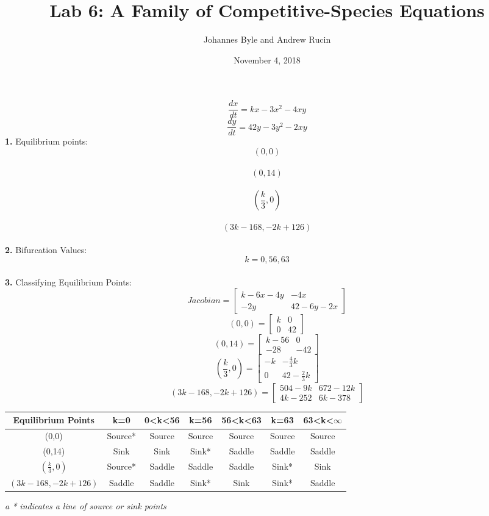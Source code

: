 \documentclass[english]{article}
\begin{document}
\title{Lab 6: A Family of Competitive-Species Equations}
\author{Johannes Byle and Andrew Rucin}
\date{November 4, 2018}
\maketitle
\begin{flushleft}
$$\frac{dx}{dt}=kx-3x^2-4xy$$
$$\frac{dy}{dt}=42y-3y^2-2xy$$
\textbf{1.} Equilibrium points:\\
$$(0,0)$$\\
$$(0,14)$$\\
$$(\frac{k}{3},0)$$\\
$$(3k-168,-2k+126)$$\\
\textbf{2.} Bifurcation Values:\\
$$k=0,56,63$$\\
\textbf{3.} Classifying Equilibrium Points:\\
$$
Jacobian=
\begin{bmatrix}
k-6x-4y & -4x \\
-2y & 42-6y-2x
\end{bmatrix}
$$
$$
(0,0)=
\begin{bmatrix}
k & 0 \\
0 & 42
\end{bmatrix}
$$
$$
(0,14)=
\begin{bmatrix}
k-56 & 0 \\
-28 & -42
\end{bmatrix}
$$
$$
(\frac{k}{3},0)=
\begin{bmatrix}
-k & -\frac{4}{3}k \\
0 & 42-\frac{2}{3}k
\end{bmatrix}
$$
$$
(3k-168,-2k+126)=
\begin{bmatrix}
504-9k & 672-12k \\
4k-252 & 6k-378
\end{bmatrix}
$$
\begin{center}
 \begin{tabular}{||c c c c c c c||} 
 \hline
 Equilibrium Points & k=0 & 0<k<56 & k=56 & 56<k<63 & k=63 & 63<k<$\infty$ \\ [0.5ex] 
 \hline\hline
 (0,0) & Source* & Source & Source & Source & Source & Source \\ 
 \hline
 (0,14) & Sink & Sink & Sink* & Saddle & Saddle & Saddle \\
 \hline
 $(\frac{k}{3},0)$ & Source* & Saddle & Saddle & Saddle & Sink* & Sink \\
 \hline
 $(3k-168,-2k+126)$ & Saddle & Saddle & Sink* & Sink & Sink* & Saddle \\ [1ex] 
 \hline
\end{tabular}
\end{center}
\textit{a * indicates a line of source or sink points}


\end{flushleft}
\end{document}
